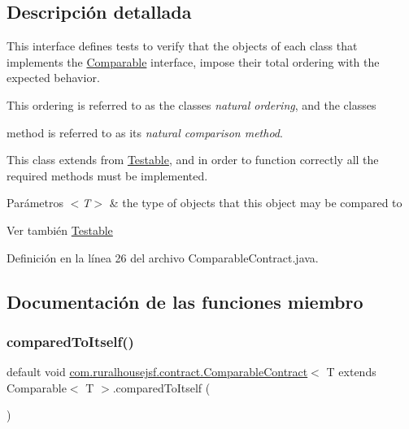 \subsection{Descripción detallada}
This interface defines tests to verify that the objects of each class that implements the \mbox{\hyperlink{}{Comparable}} interface, impose their total ordering with the expected behavior. 

This ordering is referred to as the classes {\itshape natural ordering}, and the classes
\begin{DoxyCode}{0}
\end{DoxyCode}
 method is referred to as its {\itshape natural comparison method}. 

This class extends from \mbox{\hyperlink{a00244}{Testable}}, and in order to function correctly all the required methods must be implemented.


\begin{DoxyParams}{Parámetros}
{\em $<$\+T$>$} & the type of objects that this object may be compared to\\
\hline
\end{DoxyParams}
\begin{DoxySeeAlso}{Ver también}
\mbox{\hyperlink{a00244}{Testable}} 
\end{DoxySeeAlso}


Definición en la línea 26 del archivo Comparable\+Contract.\+java.



\subsection{Documentación de las funciones miembro}
\mbox{\label{a00236_ad21966d20e5fffd0fa13cd021c262f11}} 
\subsubsection{\texorpdfstring{comparedToItself()}{comparedToItself()}}
{\footnotesize\ttfamily default void \mbox{\hyperlink{a00236}{com.\+ruralhousejsf.\+contract.\+Comparable\+Contract}}$<$ T extends Comparable$<$ T $>$.compared\+To\+Itself (\begin{DoxyParamCaption}{ }\end{DoxyParamCaption})}



